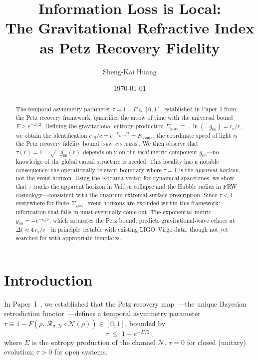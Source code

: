 \documentclass[prl,twocolumn,superscriptaddress,longbibliography,floatfix]{revtex4-2}
\newcommand{\Petz}{\mathcal{R}}
\newcommand{\chan}{\mathcal{N}}
\newcommand{\tauasym}{\tau}
\newcommand{\ceff}{c_{\mathrm{eff}}}
\newcommand{\rs}{r_{\mathrm{s}}}
\newcommand{\Sgrav}{\Sigma_{\mathrm{grav}}}
\newcommand{\Fbound}{F_{\mathrm{bound}}}
\begin{document}
\title{Information Loss is Local:\\
The Gravitational Refractive Index as Petz Recovery Fidelity}

\author{Sheng-Kai Huang}

\date{\today}

\begin{abstract}
The temporal asymmetry parameter
$\tauasym = 1 - F \in [0,1]$, established in Paper~I
from the Petz recovery framework, quantifies the arrow
of time with the universal bound $F \geq e^{-\Sigma/2}$.
Defining the gravitational entropy production
$\Sgrav \equiv -\ln(-g_{00}) = \rs/r$, we obtain the
identification
$\ceff/c = e^{-\Sgrav/2} = \Fbound$:
the coordinate speed of light \emph{is} the Petz recovery
fidelity bound [\textsc{new synthesis}].
We then observe that $\tauasym(r) = 1 - \sqrt{-g_{00}(r)}$
depends only on the \emph{local} metric component $g_{00}$---no
knowledge of the global causal structure is needed.
This locality has a notable consequence:
the operationally relevant boundary where
$\tauasym = 1$ is the \emph{apparent horizon},
not the event horizon.
Using the Kodama vector for dynamical spacetimes, we show
that $\tauasym$ tracks the apparent horizon in Vaidya
collapse and the Hubble radius in FRW cosmology---consistent
with the quantum extremal surface prescription.
Since $\tauasym < 1$ everywhere for finite
$\Sgrav$, event horizons are excluded within this
framework: information that falls in must eventually
come out.
The exponential metric $g_{00} = -e^{-\rs/r}$,
which saturates the Petz bound, predicts
gravitational-wave echoes at
$\Delta t \approx 4\,\rs/c$---in principle testable
with existing LIGO--Virgo data, though not yet searched
for with appropriate templates.
\end{abstract}

\maketitle

\section{Introduction}
\label{sec:intro}

In Paper~I~\cite{Paper1}, we established that the Petz
recovery map~\cite{Petz1988}---the unique Bayesian
retrodiction functor~\cite{Parzygnat2023}---defines
a temporal asymmetry parameter
$\tauasym \equiv 1 - F(\rho,\,\Petz_{\sigma,\chan}\!\circ\!\chan(\rho))
\in [0,1]$, bounded by~\cite{Fawzi2015,JRSWW2018}
\begin{equation}
  \tauasym \;\leq\; 1 - e^{-\Sigma/2}\,,
  \label{eq:tau_bound_paper1}
\end{equation}
where $\Sigma$ is the entropy production of the
channel $\chan$.
$\tauasym = 0$ for closed (unitary) evolution;
$\tauasym > 0$ for open systems.
\end{document}
